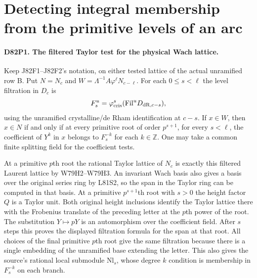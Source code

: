 \section{Detecting integral membership from the primitive levels of an arc}

\paragraph{D82P1. The filtered Taylor test for the physical Wach lattice.}
Keep J82F1--J82F2's notation, on either tested lattice of the
actual unramified row B. Put $N=N_c$ and
$W=\Lambda^{-1}A\varphi^\ell N_{c-\ell}$.
For each $0\le s<\ell$ the level filtration in $D_c$ is
\[
        F_s^u=\varphi_{\rm cris}^s
          (\mathrm{Fil}^uD_{{\rm dR},c-s}),
\]
using the unramified crystalline/de Rham identification at
$c-s$. If $x\in W$, then $x\in N$ if and only if at every
primitive root of order $p^{s+1}$, for every $s<\ell$, the
coefficient of $Y^k$ in $x$ belongs to $F_s^{-k}$ for each
$k\in\mathbb Z$. One may take a common finite splitting field
for the coefficient tests.

At a primitive $p$th root the rational Taylor lattice of $N_c$
is exactly this filtered Laurent lattice by W79H2--W79H3. An
invariant Wach basis also gives a basis over the original series
ring by L81S2, so the span in the Taylor ring can be computed in
that basis. At a primitive $p^{s+1}$th root with $s>0$ the
height factor $Q$ is a Taylor unit. Both original height
inclusions identify the Taylor lattice there with the Frobenius
translate of the preceding letter at the $p$th power of the
root. The substitution $Y\mapsto pY$ is an automorphism over
the coefficient field. After $s$ steps this proves the displayed
filtration formula for the span at that root. All choices of
the final primitive $p$th root give the same filtration because
there is a single embedding of the unramified base extending
the letter. This also gives the source's rational local
submodule $\mathrm{Nl}_s$, whose degree $k$ condition is
membership in $F_s^{-k}$ on each branch.

